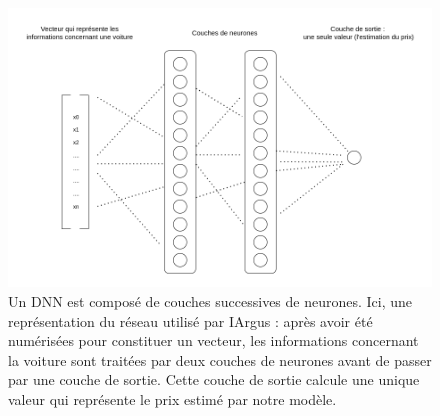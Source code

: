 \documentclass[french]{article}
\begin{document}
    
    \begin{figure}[h!]
        \includegraphics[width=12cm]{dnn}
        \centering
        \caption{Un DNN est composé de couches successives de neurones. Ici, une représentation du réseau utilisé par IArgus : après avoir été numérisées pour constituer un vecteur, les informations concernant la voiture sont traitées par deux couches de neurones avant de passer par une couche de sortie. Cette couche de sortie calcule une unique valeur qui représente le prix estimé par notre modèle.}
    \end{figure}
\end{document}

